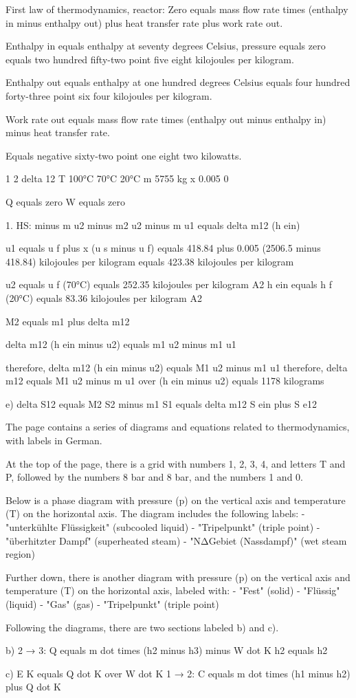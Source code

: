 First law of thermodynamics, reactor:
Zero equals mass flow rate times (enthalpy in minus enthalpy out) plus heat transfer rate plus work rate out.

Enthalpy in equals enthalpy at seventy degrees Celsius, pressure equals zero equals two hundred fifty-two point five eight kilojoules per kilogram.

Enthalpy out equals enthalpy at one hundred degrees Celsius equals four hundred forty-three point six four kilojoules per kilogram.

Work rate out equals mass flow rate times (enthalpy out minus enthalpy in) minus heat transfer rate.

Equals negative sixty-two point one eight two kilowatts.

1    2    delta 12  
T    100°C  70°C  20°C  
m    5755 kg  
x    0.005    0  

Q equals zero    W equals zero  

1. HS: minus m u2 minus m2 u2 minus m u1 equals delta m12 (h ein)  

u1 equals u f plus x (u s minus u f) equals 418.84 plus 0.005 (2506.5 minus 418.84) kilojoules per kilogram  
equals 423.38 kilojoules per kilogram  

u2 equals u f (70°C) equals 252.35 kilojoules per kilogram A2  
h ein equals h f (20°C) equals 83.36 kilojoules per kilogram A2  

M2 equals m1 plus delta m12  

delta m12 (h ein minus u2) equals m1 u2 minus m1 u1  

therefore, delta m12 (h ein minus u2) equals M1 u2 minus m1 u1  
therefore, delta m12 equals M1 u2 minus m u1 over (h ein minus u2)  
equals 1178 kilograms  

e) delta S12 equals M2 S2 minus m1 S1 equals delta m12 S ein plus S e12

The page contains a series of diagrams and equations related to thermodynamics, with labels in German. 

At the top of the page, there is a grid with numbers 1, 2, 3, 4, and letters T and P, followed by the numbers 8 bar and 8 bar, and the numbers 1 and 0.

Below is a phase diagram with pressure (p) on the vertical axis and temperature (T) on the horizontal axis. The diagram includes the following labels:
- "unterkühlte Flüssigkeit" (subcooled liquid)
- "Tripelpunkt" (triple point)
- "überhitzter Dampf" (superheated steam)
- "NΔGebiet (Nassdampf)" (wet steam region)

Further down, there is another diagram with pressure (p) on the vertical axis and temperature (T) on the horizontal axis, labeled with:
- "Fest" (solid)
- "Flüssig" (liquid)
- "Gas" (gas)
- "Tripelpunkt" (triple point)

Following the diagrams, there are two sections labeled b) and c).

b) 2 → 3:
Q equals m dot times (h2 minus h3) minus W dot K
h2 equals h2

c) E K equals Q dot K over W dot K
1 → 2: C equals m dot times (h1 minus h2) plus Q dot K
